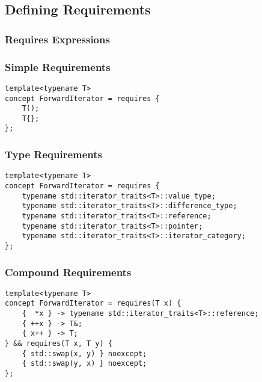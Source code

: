        

\subsection{Defining Requirements} \label{sec:defining_requirements}

    \subsubsection{Requires Expressions} \label{sec:requires_expressions}

        

        \subsubsection*{Simple Requirements} \label{sec:simple_requirements}

        \begin{lstlisting}
template<typename T>
concept ForwardIterator = requires {
    T();
    T{};
}; \end{lstlisting}

        \subsubsection*{Type Requirements} \label{sec:type_requirements}

        \begin{lstlisting}
template<typename T>
concept ForwardIterator = requires {
    typename std::iterator_traits<T>::value_type;
    typename std::iterator_traits<T>::difference_type;
    typename std::iterator_traits<T>::reference;
    typename std::iterator_traits<T>::pointer;
    typename std::iterator_traits<T>::iterator_category;
}; \end{lstlisting}

        \subsubsection*{Compound Requirements} \label{sec:compound_requirements}

        \begin{lstlisting}
template<typename T>
concept ForwardIterator = requires(T x) {
    {  *x } -> typename std::iterator_traits<T>::reference;
    { ++x } -> T&;
    { x++ } -> T;
} && requires(T x, T y) {
    { std::swap(x, y) } noexcept;
    { std::swap(y, x) } noexcept;
}; \end{lstlisting}

